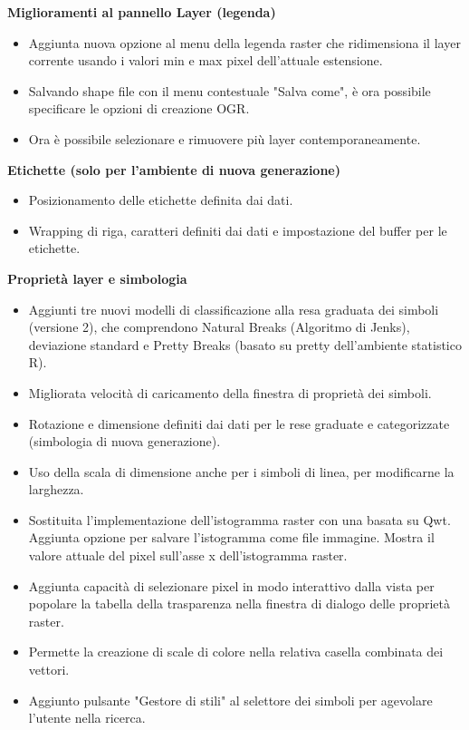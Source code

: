 \textbf{Miglioramenti al pannello Layer (legenda)}

\begin{itemize}[label=--]
\item Aggiunta nuova opzione al menu della legenda raster che ridimensiona il layer corrente usando i valori min e max pixel dell'attuale estensione. 
\item Salvando shape file con il menu contestuale "Salva come", è ora possibile specificare le opzioni di creazione OGR. 
\item Ora è possibile selezionare e rimuovere più layer contemporaneamente.
\end{itemize}

\textbf{Etichette (solo per l'ambiente di nuova generazione)}

\begin{itemize}[label=--]
\item Posizionamento delle etichette definita dai dati. 
\item Wrapping di riga, caratteri definiti dai dati e impostazione del buffer per le etichette.
\end{itemize}

\textbf{Proprietà layer e simbologia}

\begin{itemize}[label=--]
\item Aggiunti tre nuovi modelli di classificazione alla resa graduata dei simboli (versione 2), che comprendono Natural Breaks (Algoritmo di Jenks), deviazione standard e Pretty Breaks (basato su pretty dell'ambiente statistico R).
\item Migliorata velocità di caricamento della finestra di proprietà dei simboli.
\item Rotazione e dimensione definiti dai dati per le rese graduate e categorizzate (simbologia di nuova generazione).
\item Uso della scala di dimensione anche per i simboli di linea, per modificarne la larghezza. 
\item Sostituita l'implementazione dell'istogramma raster con una basata su Qwt. Aggiunta opzione per salvare l'istogramma come file immagine. Mostra il valore attuale del pixel sull'asse x dell'istogramma raster. 
\item Aggiunta capacità di selezionare pixel in modo interattivo dalla vista per popolare la tabella della trasparenza nella finestra di dialogo delle proprietà raster.
\item Permette la creazione di scale di colore nella relativa casella combinata dei vettori.
\item Aggiunto pulsante "Gestore di stili" al selettore dei simboli per agevolare l'utente nella ricerca.
\end{itemize}

